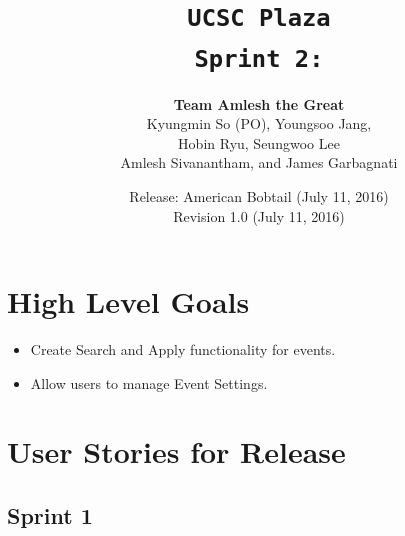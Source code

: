 \documentclass[10pt]{article}
\title{\color{primary}\texttt{UCSC Plaza \\ Sprint 2:}}
\author{{\color{secondary}\textbf{Team Amlesh the Great}} \\ Kyungmin So (PO), Youngsoo Jang, \\ Hobin Ryu, Seungwoo Lee \\ Amlesh Sivanantham, and James Garbagnati }
\date{Release: American Bobtail (July 11, 2016) \\ Revision 1.0 (July 11, 2016)}
\newcommand{\fancysecX}[2] {{\color{primary}\section*{#1} \label{sec:#2}}}
\newcommand{\fancysubX}[2] {{\color{primary}\subsection*{#1} \label{sec:#2}}}
\begin{document}
\maketitle

\fancysecX{High Level Goals}{goals}

    \begin{itemize}
        \item Create Search and Apply functionality for events.
        \item Allow users to manage Event Settings.
    \end{itemize}
    
\fancysecX{User Stories for Release}{stories}
    
    \fancysubX{Sprint 1}{sprint1}
     
\end{document}
